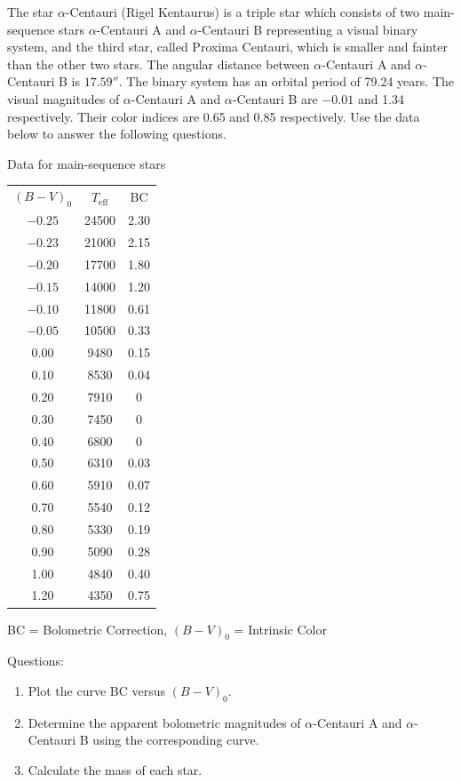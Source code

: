 The star $\alpha$-Centauri (Rigel Kentaurus) is a triple star which consists
of two main-sequence stars $\alpha$-Centauri A and $\alpha$-Centauri B
representing a visual binary system, and the third star, called Proxima
Centauri, which is smaller and fainter than the other two stars. The angular
distance between $\alpha$-Centauri A and $\alpha$-Centauri B is $17.59''$.
The binary system has an orbital period of 79.24 years. The visual magnitudes
of $\alpha$-Centauri A and $\alpha$-Centauri B are $-0.01$ and 1.34
respectively. Their color indices are 0.65 and 0.85 respectively. Use the
data below to answer the following questions.

\begin{center}
Data for main-sequence stars

\medskip
\begin{tabular}{ccc}
$(B-V)_0$ & $T_{\mathrm{eff}}$ & BC \\
$-0.25$ & 24500 & 2.30 \\
$-0.23$ & 21000 & 2.15 \\
$-0.20$ & 17700 & 1.80 \\
$-0.15$ & 14000 & 1.20 \\
$-0.10$ & 11800 & 0.61 \\
$-0.05$ & 10500 & 0.33 \\
0.00 & 9480 & 0.15 \\
0.10 & 8530 & 0.04 \\
0.20 & 7910 & 0 \\
0.30 & 7450 & 0 \\
0.40 & 6800 & 0 \\
0.50 & 6310 & 0.03 \\
0.60 & 5910 & 0.07 \\
0.70 & 5540 & 0.12 \\
0.80 & 5330 & 0.19 \\
0.90 & 5090 & 0.28 \\
1.00 & 4840 & 0.40 \\
1.20 & 4350 & 0.75 \\
\end{tabular}

\medskip
BC = Bolometric Correction, $(B-V)_0$ = Intrinsic Color
\end{center}

Questions:
\begin{enumerate}
\item Plot the curve BC versus $(B-V)_0$.
\item Determine the apparent bolometric magnitudes of $\alpha$-Centauri A
  and $\alpha$-Centauri B using the corresponding curve.
\item Calculate the mass of each star.
\end{enumerate}


